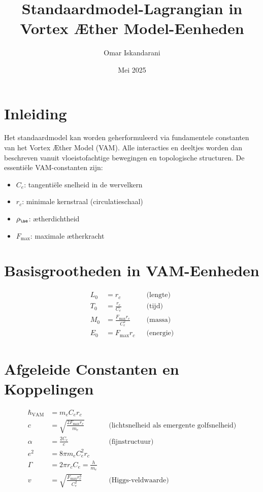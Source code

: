 \documentclass{article}
\title{Standaardmodel-Lagrangian in Vortex Æther Model-Eenheden}
\author{Omar Iskandarani}
\date{Mei 2025}
\begin{document}
    \maketitle

    \section{Inleiding}
    Het standaardmodel kan worden geherformuleerd via fundamentele constanten van het Vortex Æther Model (VAM). Alle interacties en deeltjes worden dan beschreven vanuit vloeistofachtige bewegingen en topologische structuren. De essentiële VAM-constanten zijn:
    \begin{itemize}
        \item $C_e$: tangentiële snelheid in de wervelkern
        \item $r_c$: minimale kernstraal (circulatieschaal)
        \item $\rho_{\ae}$: ætherdichtheid
        \item $F_{\text{max}}$: maximale ætherkracht
    \end{itemize}

    \section{Basisgrootheden in VAM-Eenheden}
    \begin{align*}
        L_0 &= r_c &&\text{(lengte)} \\
        T_0 &= \frac{r_c}{C_e} &&\text{(tijd)} \\
        M_0 &= \frac{F_{\text{max}} r_c}{C_e^2} &&\text{(massa)} \\
        E_0 &= F_{\text{max}} r_c &&\text{(energie)}
    \end{align*}

    \section{Afgeleide Constanten en Koppelingen}
    \begin{align*}
        \hbar_{\text{VAM}} &= m_e C_e r_c \\
        c &= \sqrt{\frac{2 F_{\text{max}} r_c}{m_e}} &&\text{(lichtsnelheid als emergente golfsnelheid)} \\
        \alpha &= \frac{2 C_e}{c} &&\text{(fijnstructuur)} \\
        e^2 &= 8\pi m_e C_e^2 r_c \\
        \Gamma &= 2\pi r_c C_e = \frac{h}{m_e} \\
        v &= \sqrt{\frac{F_{\text{max}} r_c^3}{C_e^2}} &&\text{(Higgs-veldwaarde)}
    \end{align*}
\end{document}
